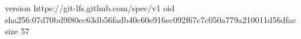 version https://git-lfs.github.com/spec/v1
oid sha256:07d70bd9f80ec63db56fadb40c60e916ec092f67c7c050a779a210011d56dfac
size 57
